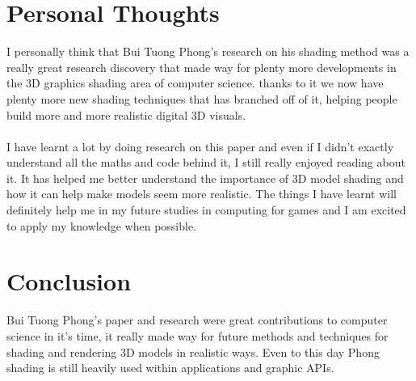 \documentclass{scrartcl}
\begin{document}
\section{Personal Thoughts}
I personally think that Bui Tuong Phong's research on his shading method was a really great research discovery that made way for plenty more developments in the 3D graphics shading area of computer science. thanks to it we now have plenty more new shading techniques that has branched off of it, helping people build more and more realistic digital 3D visuals.
\\~\\
I have learnt a lot by doing research on this paper and even if I didn't exactly understand all the maths and code behind it, I still really enjoyed reading about it. It has helped me better understand the importance of 3D model shading and how it can help make models seem more realistic. The things I have learnt will definitely help me in my future studies in computing for games and I am excited to apply my knowledge when possible.

\section{Conclusion}
Bui Tuong Phong's paper and research were great contributions to computer science in it's time, it really made way for future methods and techniques for shading and rendering 3D models in realistic ways. Even to this day Phong shading is still heavily used within applications and graphic APIs.



\end{document}
